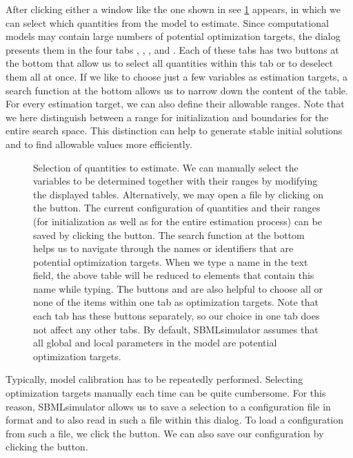 After clicking either a window like the one shown in see \cref{fig:quantitySelection} appears, in which we can select which quantities from the model to estimate.
Since computational models may contain large numbers of potential optimization targets, the dialog presents them in the four tabs , , , and .
Each of these tabs has two buttons at the bottom that allow us to select all quantities within this tab or to deselect them all at once.
If we like to choose just a few variables as estimation targets, a search function at the bottom allows us to narrow down the content of the table.
For every estimation target, we can also define their allowable ranges.
Note that we here distinguish between a range for initialization and boundaries for the entire search space.
This distinction can help to generate stable initial solutions and to find allowable values more efficiently.
\begin{figure}[t]
\centering
{}
\caption[Selection of quantities to estimate]{Selection of quantities to estimate.
We can manually select the variables to be determined together with their ranges by modifying the displayed tables.
Alternatively, we may open a \CSV file by clicking on the  button.
The current configuration of quantities and their ranges (for initialization as well as for the entire estimation process) can be saved by clicking the  button.
The search function at the bottom helps us to navigate through the names or identifiers that are potential optimization targets.
When we type a name in the text field, the above table will be reduced to elements that contain this name while typing.
The buttons  and  are also helpful to choose all or none of the items within one tab as optimization targets.
Note that each tab has these buttons separately, so our choice in one tab does not affect any other tabs.
By default, SBMLsimulator assumes that all global and local parameters in the model are potential optimization targets.}
\label{fig:quantitySelection}
\end{figure}

Typically, model calibration has to be repeatedly performed.
Selecting optimization targets manually each time can be quite cumbersome.
For this reason, SBMLsimulator allows us to save a selection to a configuration file in \CSV format and to also read in such a file within this dialog.
To load a configuration from such a file, we click the  button.
We can also save our configuration by clicking the  button.

